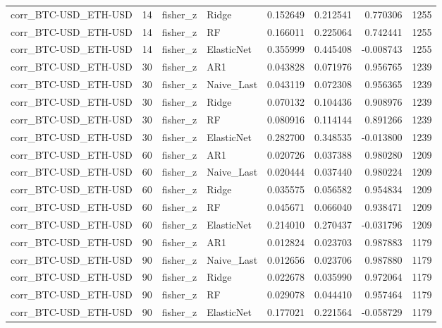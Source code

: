 \begin{table}
\begin{tabular}{lrllrrrr}
corr_BTC-USD_ETH-USD & 14 & fisher_z & Ridge & 0.152649 & 0.212541 & 0.770306 & 1255 \\
corr_BTC-USD_ETH-USD & 14 & fisher_z & RF & 0.166011 & 0.225064 & 0.742441 & 1255 \\
corr_BTC-USD_ETH-USD & 14 & fisher_z & ElasticNet & 0.355999 & 0.445408 & -0.008743 & 1255 \\
corr_BTC-USD_ETH-USD & 30 & fisher_z & AR1 & 0.043828 & 0.071976 & 0.956765 & 1239 \\
corr_BTC-USD_ETH-USD & 30 & fisher_z & Naive_Last & 0.043119 & 0.072308 & 0.956365 & 1239 \\
corr_BTC-USD_ETH-USD & 30 & fisher_z & Ridge & 0.070132 & 0.104436 & 0.908976 & 1239 \\
corr_BTC-USD_ETH-USD & 30 & fisher_z & RF & 0.080916 & 0.114144 & 0.891266 & 1239 \\
corr_BTC-USD_ETH-USD & 30 & fisher_z & ElasticNet & 0.282700 & 0.348535 & -0.013800 & 1239 \\
corr_BTC-USD_ETH-USD & 60 & fisher_z & AR1 & 0.020726 & 0.037388 & 0.980280 & 1209 \\
corr_BTC-USD_ETH-USD & 60 & fisher_z & Naive_Last & 0.020444 & 0.037440 & 0.980224 & 1209 \\
corr_BTC-USD_ETH-USD & 60 & fisher_z & Ridge & 0.035575 & 0.056582 & 0.954834 & 1209 \\
corr_BTC-USD_ETH-USD & 60 & fisher_z & RF & 0.045671 & 0.066040 & 0.938471 & 1209 \\
corr_BTC-USD_ETH-USD & 60 & fisher_z & ElasticNet & 0.214010 & 0.270437 & -0.031796 & 1209 \\
corr_BTC-USD_ETH-USD & 90 & fisher_z & AR1 & 0.012824 & 0.023703 & 0.987883 & 1179 \\
corr_BTC-USD_ETH-USD & 90 & fisher_z & Naive_Last & 0.012656 & 0.023706 & 0.987880 & 1179 \\
corr_BTC-USD_ETH-USD & 90 & fisher_z & Ridge & 0.022678 & 0.035990 & 0.972064 & 1179 \\
corr_BTC-USD_ETH-USD & 90 & fisher_z & RF & 0.029078 & 0.044410 & 0.957464 & 1179 \\
corr_BTC-USD_ETH-USD & 90 & fisher_z & ElasticNet & 0.177021 & 0.221564 & -0.058729 & 1179 \\
\bottomrule
\end{tabular}
\end{table}
